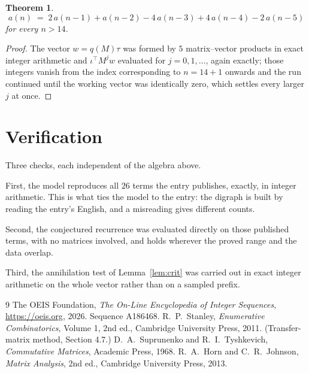 \documentclass[11pt,a4paper]{article}
\theoremstyle{plain}
\newtheorem{theorem}{Theorem}
\theoremstyle{definition}
\begin{document}
\begin{theorem}
\[
a(n)\;=\;2\,a(n-1) + a(n-2) - 4\,a(n-3) + 4\,a(n-4) - 2\,a(n-5)
\]
for every $n>14$.
\end{theorem}

\begin{proof}
The vector $w=q(M)\tau$ was formed by $5$ matrix--vector products in exact integer
arithmetic and $\iota^{\!\top}M^{j}w$ evaluated for $j=0,1,\dots$, again exactly; those
integers vanish from the index corresponding to $n=14+1$ onwards and the run continued
until the working vector was identically zero, which settles every larger $j$ at once.
\end{proof}

\section{Verification}

Three checks, each independent of the algebra above.

First, the model reproduces all $26$ terms the entry publishes, exactly, in integer
arithmetic. This is what ties the model to the entry: the digraph is built by reading the
entry's English, and a misreading gives different counts.

Second, the conjectured recurrence was evaluated directly on those published terms, with no
matrices involved, and holds wherever the proved range and the data overlap.

Third, the annihilation test of Lemma~\ref{lem:crit} was carried out in exact integer
arithmetic on the whole vector rather than on a sampled prefix.

\begin{thebibliography}{9}
 The OEIS Foundation, \emph{The On-Line Encyclopedia of Integer
Sequences}, \url{https://oeis.org}, 2026. Sequence A186468.
 R.~P.~Stanley, \emph{Enumerative Combinatorics}, Volume 1, 2nd ed.,
Cambridge University Press, 2011. (Transfer-matrix method, Section 4.7.)
 D.~A.~Suprunenko and R.~I.~Tyshkevich, \emph{Commutative Matrices},
Academic Press, 1968.
 R.~A.~Horn and C.~R.~Johnson, \emph{Matrix Analysis}, 2nd ed., Cambridge
University Press, 2013.
\end{thebibliography}
\end{document}
